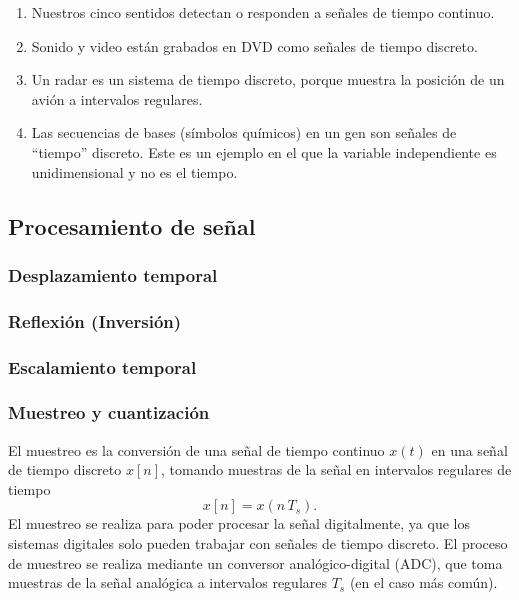 \documentclass[11pt,a4paper,openany]{book}
\begin{document}
\begin{enumerate}
	\item Nuestros cinco sentidos detectan o responden a señales de tiempo continuo.
	\item Sonido y video están grabados en DVD como señales de tiempo discreto.
	\item Un radar es un sistema de tiempo discreto, porque muestra la posición de un avión a intervalos regulares.
	\item Las secuencias de bases (símbolos químicos) en un gen son señales de ``tiempo'' discreto. Este es un ejemplo en el que la variable independiente es unidimensional y no es el tiempo.
\end{enumerate}

	\subsection{Procesamiento de señal}
	
	\subsubsection{Desplazamiento temporal}
	
	\subsubsection{Reflexión (Inversión)}
	
	\subsubsection{Escalamiento temporal}
	
\subsubsection{Muestreo y cuantización}

El muestreo es la conversión de una señal de tiempo continuo $x(t)$ en una señal de tiempo discreto $x[n]$, tomando muestras de la señal en intervalos regulares de tiempo
\begin{equation}
	x[n] = x(n \, T_{s}).
\end{equation}
El muestreo se realiza para poder procesar la señal digitalmente, ya que los sistemas digitales solo pueden trabajar con señales de tiempo discreto. El proceso de muestreo se realiza mediante un conversor analógico-digital (ADC), que toma muestras de la señal analógica a intervalos regulares $T_{s}$ (en el caso más común).
\end{document}
